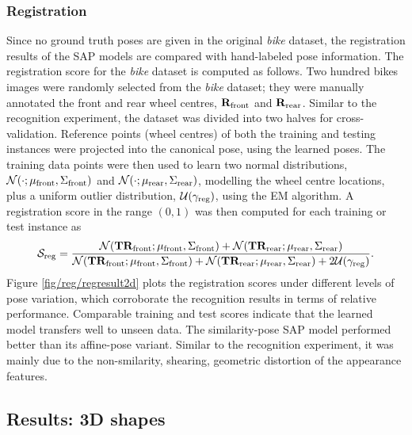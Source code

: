 \subsubsection{Registration} 
Since no ground truth poses are given in the original \emph{bike} dataset, the registration results of the SAP models are compared with hand-labeled pose information. 
The registration score for the \emph{bike} dataset is computed as follows.
Two hundred bikes images were randomly selected from the \emph{bike} dataset; they were manually annotated the front and rear wheel centres, $\mathbf{R}_\mathrm{front}$ and $\mathbf{R}_\mathrm{rear}$.
Similar to the recognition experiment, the dataset was divided into two halves for cross-validation. 
Reference points (wheel centres) of both the training and testing instances were projected into the canonical pose, using the learned poses. The training data points were then used to learn two normal distributions, $\mathcal{N}(\cdot;\mu_\mathrm{front},\Sigma_\mathrm{front})$ and $\mathcal{N}(\cdot;\mu_\mathrm{rear},\Sigma_\mathrm{rear})$, modelling the wheel centre locations, plus a uniform outlier distribution, $\mathcal{U}(\gamma_\mathrm{reg})$, using the EM algorithm. A registration score in the range $(0,1)$ was then computed for each training or test instance as
\begin{equation}
	\mathcal{S}_\mathrm{reg} = \frac{\mathcal{N}(\mathbf{T}\mathbf{R}_\mathrm{front}; \mu_\mathrm{front},\Sigma_\mathrm{front}) + \mathcal{N}(\mathbf{T}\mathbf{R}_\mathrm{rear}; \mu_\mathrm{rear},\Sigma_\mathrm{rear})}{\mathcal{N}(\mathbf{T}\mathbf{R}_\mathrm{front}; \mu_\mathrm{front},\Sigma_\mathrm{front}) + \mathcal{N}(\mathbf{T}\mathbf{R}_\mathrm{rear}; \mu_\mathrm{rear},\Sigma_\mathrm{rear}) + 2\mathcal{U}(\gamma_\mathrm{reg})}.
	\label{eqn/reg/reg2d_score}
\end{equation}
Figure \ref{fig/reg/regresult2d} plots the registration scores under different levels of pose variation, which corroborate the recognition results in terms of relative performance. 
Comparable training and test scores indicate that the learned model transfers well to unseen data. The similarity-pose SAP model performed better than its affine-pose variant. Similar to the recognition experiment, it was mainly due to the non-smilarity, \eg shearing, geometric distortion of the appearance features. 

\subsection{Results: 3D shapes}

